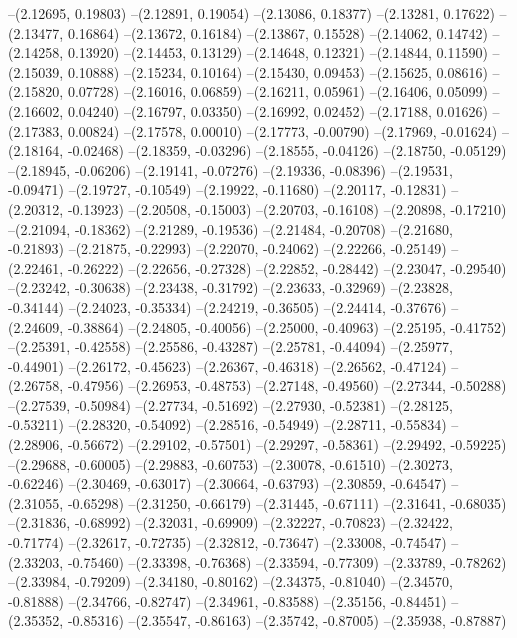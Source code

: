 --(2.12695, 0.19803)
--(2.12891, 0.19054)
--(2.13086, 0.18377)
--(2.13281, 0.17622)
--(2.13477, 0.16864)
--(2.13672, 0.16184)
--(2.13867, 0.15528)
--(2.14062, 0.14742)
--(2.14258, 0.13920)
--(2.14453, 0.13129)
--(2.14648, 0.12321)
--(2.14844, 0.11590)
--(2.15039, 0.10888)
--(2.15234, 0.10164)
--(2.15430, 0.09453)
--(2.15625, 0.08616)
--(2.15820, 0.07728)
--(2.16016, 0.06859)
--(2.16211, 0.05961)
--(2.16406, 0.05099)
--(2.16602, 0.04240)
--(2.16797, 0.03350)
--(2.16992, 0.02452)
--(2.17188, 0.01626)
--(2.17383, 0.00824)
--(2.17578, 0.00010)
--(2.17773, -0.00790)
--(2.17969, -0.01624)
--(2.18164, -0.02468)
--(2.18359, -0.03296)
--(2.18555, -0.04126)
--(2.18750, -0.05129)
--(2.18945, -0.06206)
--(2.19141, -0.07276)
--(2.19336, -0.08396)
--(2.19531, -0.09471)
--(2.19727, -0.10549)
--(2.19922, -0.11680)
--(2.20117, -0.12831)
--(2.20312, -0.13923)
--(2.20508, -0.15003)
--(2.20703, -0.16108)
--(2.20898, -0.17210)
--(2.21094, -0.18362)
--(2.21289, -0.19536)
--(2.21484, -0.20708)
--(2.21680, -0.21893)
--(2.21875, -0.22993)
--(2.22070, -0.24062)
--(2.22266, -0.25149)
--(2.22461, -0.26222)
--(2.22656, -0.27328)
--(2.22852, -0.28442)
--(2.23047, -0.29540)
--(2.23242, -0.30638)
--(2.23438, -0.31792)
--(2.23633, -0.32969)
--(2.23828, -0.34144)
--(2.24023, -0.35334)
--(2.24219, -0.36505)
--(2.24414, -0.37676)
--(2.24609, -0.38864)
--(2.24805, -0.40056)
--(2.25000, -0.40963)
--(2.25195, -0.41752)
--(2.25391, -0.42558)
--(2.25586, -0.43287)
--(2.25781, -0.44094)
--(2.25977, -0.44901)
--(2.26172, -0.45623)
--(2.26367, -0.46318)
--(2.26562, -0.47124)
--(2.26758, -0.47956)
--(2.26953, -0.48753)
--(2.27148, -0.49560)
--(2.27344, -0.50288)
--(2.27539, -0.50984)
--(2.27734, -0.51692)
--(2.27930, -0.52381)
--(2.28125, -0.53211)
--(2.28320, -0.54092)
--(2.28516, -0.54949)
--(2.28711, -0.55834)
--(2.28906, -0.56672)
--(2.29102, -0.57501)
--(2.29297, -0.58361)
--(2.29492, -0.59225)
--(2.29688, -0.60005)
--(2.29883, -0.60753)
--(2.30078, -0.61510)
--(2.30273, -0.62246)
--(2.30469, -0.63017)
--(2.30664, -0.63793)
--(2.30859, -0.64547)
--(2.31055, -0.65298)
--(2.31250, -0.66179)
--(2.31445, -0.67111)
--(2.31641, -0.68035)
--(2.31836, -0.68992)
--(2.32031, -0.69909)
--(2.32227, -0.70823)
--(2.32422, -0.71774)
--(2.32617, -0.72735)
--(2.32812, -0.73647)
--(2.33008, -0.74547)
--(2.33203, -0.75460)
--(2.33398, -0.76368)
--(2.33594, -0.77309)
--(2.33789, -0.78262)
--(2.33984, -0.79209)
--(2.34180, -0.80162)
--(2.34375, -0.81040)
--(2.34570, -0.81888)
--(2.34766, -0.82747)
--(2.34961, -0.83588)
--(2.35156, -0.84451)
--(2.35352, -0.85316)
--(2.35547, -0.86163)
--(2.35742, -0.87005)
--(2.35938, -0.87887)
